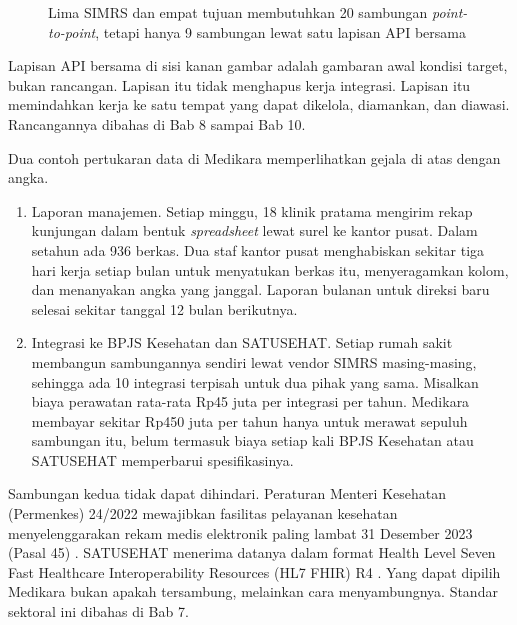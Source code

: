 \begin{figure}[!htb]
  \centering
  
  \caption{Lima SIMRS dan empat tujuan membutuhkan 20 sambungan
           \textit{point-to-point}, tetapi hanya 9 sambungan lewat satu lapisan
           API bersama}
  \label{fig:ch01-point-to-point}
\end{figure}

Lapisan API bersama di sisi kanan gambar adalah gambaran awal kondisi target,
bukan rancangan. Lapisan itu tidak menghapus kerja integrasi. Lapisan itu
memindahkan kerja ke satu tempat yang dapat dikelola, diamankan, dan diawasi.
Rancangannya dibahas di Bab 8 sampai Bab 10.

\begin{kasus}[title={Kasus Medikara Health: Laporan Spreadsheet dan Sambungan Point-to-Point}]
Dua contoh pertukaran data di Medikara memperlihatkan gejala di atas dengan
angka.

\begin{enumerate}
  \item Laporan manajemen. Setiap minggu, 18 klinik pratama mengirim rekap
        kunjungan dalam bentuk \textit{spreadsheet} lewat surel ke kantor pusat.
        Dalam setahun ada 936 berkas. Dua staf kantor pusat menghabiskan sekitar
        tiga hari kerja setiap bulan untuk menyatukan berkas itu, menyeragamkan
        kolom, dan menanyakan angka yang janggal. Laporan bulanan untuk direksi
        baru selesai sekitar tanggal 12 bulan berikutnya.
  \item Integrasi ke BPJS Kesehatan dan SATUSEHAT. Setiap rumah sakit membangun
        sambungannya sendiri lewat vendor SIMRS masing-masing, sehingga ada 10
        integrasi terpisah untuk dua pihak yang sama. Misalkan biaya perawatan
        rata-rata Rp45 juta per integrasi per tahun. Medikara membayar sekitar
        Rp450 juta per tahun hanya untuk merawat sepuluh sambungan itu, belum
        termasuk biaya setiap kali BPJS Kesehatan atau SATUSEHAT memperbarui
        spesifikasinya.
\end{enumerate}

Sambungan kedua tidak dapat dihindari. Peraturan Menteri Kesehatan (Permenkes)
24/2022 mewajibkan fasilitas pelayanan kesehatan menyelenggarakan rekam medis
elektronik paling lambat 31 Desember 2023 (Pasal 45) \cite{permenkes24-2022}.
SATUSEHAT menerima datanya dalam format Health Level Seven Fast Healthcare
Interoperability Resources (HL7 FHIR) R4 \cite{satusehat, fhir-r4}. Yang dapat
dipilih Medikara bukan apakah tersambung, melainkan cara menyambungnya. Standar
sektoral ini dibahas di Bab 7.
\end{kasus}

